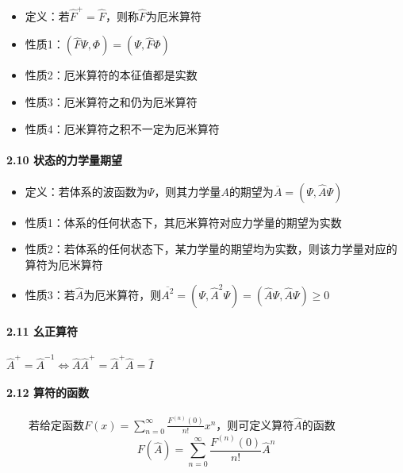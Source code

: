 \documentclass[UTF8,twocolumn]{ctexart}
\providecommand{\tightlist}{%
  \setlength{\itemsep}{0pt}\setlength{\parskip}{0pt}}
\let\oldparagraph\paragraph
\renewcommand{\paragraph}[1]{\oldparagraph{#1}\mbox{}}
\begin{document}
\begin{itemize}
\tightlist
\item
  定义：若\(\hat{F}^+=\hat{F}\)，则称\(\hat{F}\)为厄米算符
\item
  性质1：\((\hat{F}\Psi,\Phi)=(\Psi,\hat{F}\Phi)\)
\item
  性质2：厄米算符的本征值都是实数
\item
  性质3：厄米算符之和仍为厄米算符
\item
  性质4：厄米算符之积不一定为厄米算符
\end{itemize}

\hypertarget{ux72b6ux6001ux7684ux529bux5b66ux91cfux671fux671b}{%
\paragraph{ 2.10
状态的力学量期望}\label{ux72b6ux6001ux7684ux529bux5b66ux91cfux671fux671b}}

\begin{itemize}
\tightlist
\item
  定义：若体系的波函数为\(\Psi\)，则其力学量\(A\)的期望为\(\overline{A}=(\Psi,\hat{A}\Psi)\)
\item
  性质1：体系的任何状态下，其厄米算符对应力学量的期望为实数
\item
  性质2：若体系的任何状态下，某力学量的期望均为实数，则该力学量对应的算符为厄米算符
\item
  性质3：若\(\hat{A}\)为厄米算符，则\(\overline{A^2}=(\Psi,\hat{A}^2\Psi)=(\hat{A}\Psi,\hat{A}\Psi)\geq0\)
\end{itemize}

\hypertarget{ux5e7aux6b63ux7b97ux7b26}{%
\paragraph{ 2.11 幺正算符}\label{ux5e7aux6b63ux7b97ux7b26}}

\begin{center}
$\hat{A}^+=\hat{A}^{-1}\Leftrightarrow\hat{A}\hat{A}^+=\hat{A}^+\hat{A}=\hat{I}$
\end{center}

\hypertarget{ux7b97ux7b26ux7684ux51fdux6570}{%
\paragraph{ 2.12 算符的函数}\label{ux7b97ux7b26ux7684ux51fdux6570}}

  若给定函数\(F(x)=\sum_{n=0}^\infty\frac{F^{(n)}(0)}{n!}x^n\)，则可定义算符\(\hat{A}\)的函数
\[
    F(\hat{A})=\sum_{n=0}^\infty\frac{F^{(n)}(0)}{n!}\hat{A}^n
\]
\end{document}

